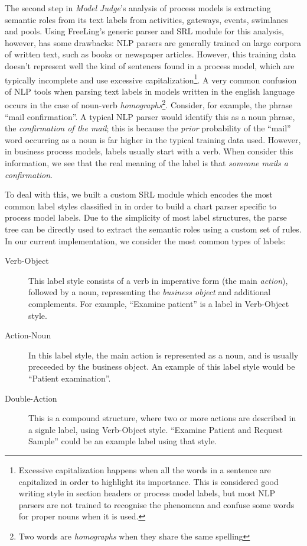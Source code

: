 The second step in \emph{Model Judge}'s analysis of process models is extracting
semantic roles from its text labels from activities, gateways, events, swimlanes
and pools. Using FreeLing's generic parser and SRL module for this analysis,
however, has some drawbacks: NLP parsers are generally trained on large corpora
of written text, such as books or newspaper articles. However, this training
data doesn't represent well the kind of sentences found in a process model,
which are typically incomplete and use excessive
capitalization\footnote{Excessive capitalization happens when all the words in a
sentence are capitalized in order to highlight its importance. This is
considered good writing style in section headers or process model labels, but
most NLP parsers are not trained to recognise the phenomena and confuse some
words for proper nouns when it is used.}. A very common confusion of NLP tools 
when parsing text labels in models written in the english language occurs in the
case of noun-verb \emph{homographs}\footnote{Two words are \emph{homographs}
  when they share the same spelling}. Consider, for example, the phrase ``mail
confirmation''. A typical NLP parser would identify this as a noun phrase, the
\emph{confirmation of the mail}; this is because the \emph{prior} probability of
the ``mail'' word occurring as a noun is far higher in the typical training data
used. However, in business process models, labels usually start with a verb.
When consider this information, we see that the real meaning of the label is
that \emph{someone mails a confirmation}.

To deal with this, we built a custom SRL module which encodes the most common
label styles classified in \cite{PittkeLM16,leopold2013detection} in order to
build a chart parser specific to process model labels. Due to the simplicity of
most label structures, the parse tree can be directly used to extract the
semantic roles using a custom set of rules. In our current implementation, we
consider the most common types of labels:

\begin{description}
  \item[Verb-Object]{This label style consists of a verb in imperative form (the
      main \emph{action}), followed by a noun, representing the \emph{business
        object} and additional complements. For example, ``Examine patient'' is
      a label in Verb-Object style.}
  \item[Action-Noun]{In this label style, the main action is represented as a
      noun, and is usually preceeded by the business object. An example of this
      label style would be ``Patient examination''.}
  \item[Double-Action]{This is a compound structure, where two or more actions
    are described in a signle label, using Verb-Object style. ``Examine Patient
    and Request Sample'' could be an example label using that style.}
\end{description}

